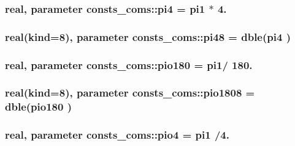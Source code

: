 \subsubsection[{\texorpdfstring{pi4}{pi4}}]{\setlength{\rightskip}{0pt plus 5cm}real, parameter consts\+\_\+coms\+::pi4 = {\bf pi1} $\ast$ 4.}\hypertarget{namespaceconsts__coms_a9ab90617058485a809d50b5bf043eda4}{}\label{namespaceconsts__coms_a9ab90617058485a809d50b5bf043eda4}
\subsubsection[{\texorpdfstring{pi48}{pi48}}]{\setlength{\rightskip}{0pt plus 5cm}real(kind=8), parameter consts\+\_\+coms\+::pi48 = dble({\bf pi4} )}\hypertarget{namespaceconsts__coms_affa58f83c899d90c43e413c5ef490e2c}{}\label{namespaceconsts__coms_affa58f83c899d90c43e413c5ef490e2c}
\subsubsection[{\texorpdfstring{pio180}{pio180}}]{\setlength{\rightskip}{0pt plus 5cm}real, parameter consts\+\_\+coms\+::pio180 = {\bf pi1}/ 180.}\hypertarget{namespaceconsts__coms_a42c7511eb2987c443fbfb41d92142b8f}{}\label{namespaceconsts__coms_a42c7511eb2987c443fbfb41d92142b8f}
\subsubsection[{\texorpdfstring{pio1808}{pio1808}}]{\setlength{\rightskip}{0pt plus 5cm}real(kind=8), parameter consts\+\_\+coms\+::pio1808 = dble({\bf pio180} )}\hypertarget{namespaceconsts__coms_a6ae896a14b40bb0f430a950730e58d8a}{}\label{namespaceconsts__coms_a6ae896a14b40bb0f430a950730e58d8a}
\subsubsection[{\texorpdfstring{pio4}{pio4}}]{\setlength{\rightskip}{0pt plus 5cm}real, parameter consts\+\_\+coms\+::pio4 = {\bf pi1} /4.}\hypertarget{namespaceconsts__coms_a54e6b465d8b81b90409f351986d2a4de}{}\label{namespaceconsts__coms_a54e6b465d8b81b90409f351986d2a4de}
